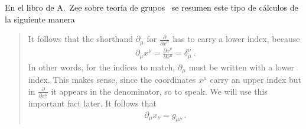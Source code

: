 En el libro de A.~Zee sobre teoría de grupos~\cite{Zee:2016fuk} se resumen este tipo de cálculos de la siguiente manera
\begin{quote}
  It follows that the shorthand $\partial_{\mu}$  for  $\frac{\partial}{\partial x^{\mu}}$  has to carry a lower index, because
  \begin{align}
  {\partial_{\mu} x^{\nu}=\frac{\partial x^{\nu}}{\partial x^{\mu}}=\delta_{\mu}^{\nu}}\,.  
  \end{align}
  In other words, for the indices to match, $\partial_{\mu}$  must be written with a lower index. This makes sense, since the coordinates $x^{\mu}$
  carry an upper index but in $\frac{\partial}{\partial x^{\mu}}$  it appears in the denominator, so to speak.
  We will use this important fact later. It follows that
  \begin{align}
  {\partial_{\mu} x_{\nu}=g_{\mu \nu}}\,.  
  \end{align}
\end{quote}



